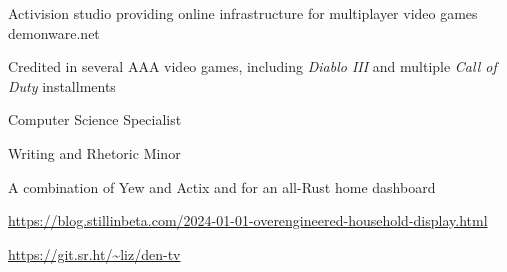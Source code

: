 \documentclass[letterpaper,11pt,notitlepage]{article}
\begin{document}
          \companydescurl
          {Activision studio providing online infrastructure for multiplayer video
            games}
          {demonware.net} \\
          \begin{employment}
          \item Credited in several AAA video games, including
            {\it Diablo III} and multiple {\it Call of Duty} installments
          \end{employment}
          \newpage
          \begin{employment}
          \item Computer Science Specialist
          \item Writing and Rhetoric Minor
          \end{employment}
          \vbar{}
          \begin{employment}
          \item A combination of Yew and Actix and for an all-Rust home dashboard
          \item \url{https://blog.stillinbeta.com/2024-01-01-overengineered-household-display.html}
          \item \url{https://git.sr.ht/~liz/den-tv}
          \end{employment}
\end{document}
